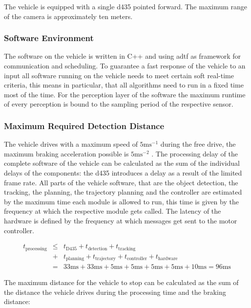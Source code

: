 The vehicle is equipped with a single \ac{d435} pointed forward. The maximum range of the camera is approximately ten meters. 

\subsubsection{Software Environment}
The software on the vehicle is written in C++ and using \ac{adtf} as framework for communication and scheduling.
To guarantee a fast response of the vehicle to an input all software running on the vehicle needs to meet certain soft real-time criteria, this means in particular, that all algorithms need to run in a fixed time most of the time. For the perception layer of the software the maximum runtime of every perception is bound to the sampling period of the respective sensor.

\subsubsection{Maximum Required Detection Distance}
The vehicle drives with a maximum speed of $5\si{\m\s^{-1}}$ during the free drive, the maximum braking acceleration possible is $5\si{\m\s^{-2}}$ . 
The processing delay of the complete software of the vehicle can be calculated as the sum of the individual delays of the components: the \ac{d435} introduces a delay as a result of the limited frame rate. All parts of the vehicle software, that are the object detection, the tracking, the planning, the trajectory planning and the controller are estimated by the maximum time each module is allowed to run, this time is given by the frequency at which the respective module gets called. 
The latency of the hardware is defined by the frequency at which messages get sent to the motor controller.

\begin{eqnarray}
    t_\text{processing} &\leq& t_\text{D435} + t_\text{detection} + t_\text{tracking} \\  
                        &+& t_\text{planning} + t_\text{trajectory} + t_\text{controller} + t_\text{hardware} \nonumber \\
                      &=& 33 \si{\ms} + 33 \si{\ms} + 5 \si{\ms} + 5 \si{\ms} + 5\si{\ms} + 5\si{\ms} + 10 \si{\ms} = 96 \si{\ms} \nonumber
\end{eqnarray}

The maximum distance for the vehicle to stop can be calculated as the sum of the distance the vehicle drives during the processing time and the braking distance:


